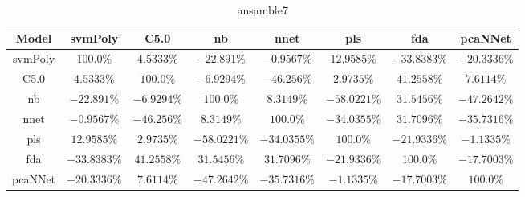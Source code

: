 \begin{table}[!ht]
	\centering
	\begin{tabular}{|c|c|c|c|c|c|c|c|}
		\hline
		Model & svmPoly & C5.0 & nb & nnet & pls & fda & pcaNNet \\ \hline
		svmPoly & $100.0\%$ & $4.5333\%$ & $-22.891\%$ & $-0.9567\%$ & $12.9585\%$ & $-33.8383\%$ & $-20.3336\%$ \\ \hline
		C5.0 & $4.5333\%$ & $100.0\%$ & $-6.9294\%$ & $-46.256\%$ & $2.9735\%$ & $41.2558\%$ & $7.6114\%$ \\ \hline
		nb & $-22.891\%$ & $-6.9294\%$ & $100.0\%$ & $8.3149\%$ & $-58.0221\%$ & $31.5456\%$ & $-47.2642\%$ \\ \hline
		nnet & $-0.9567\%$ & $-46.256\%$ & $8.3149\%$ & $100.0\%$ & $-34.0355\%$ & $31.7096\%$ & $-35.7316\%$ \\ \hline
		pls & $12.9585\%$ & $2.9735\%$ & $-58.0221\%$ & $-34.0355\%$ & $100.0\%$ & $-21.9336\%$ & $-1.1335\%$ \\ \hline
		fda & $-33.8383\%$ & $41.2558\%$ & $31.5456\%$ & $31.7096\%$ & $-21.9336\%$ & $100.0\%$ & $-17.7003\%$ \\ \hline
		pcaNNet & $-20.3336\%$ & $7.6114\%$ & $-47.2642\%$ & $-35.7316\%$ & $-1.1335\%$ & $-17.7003\%$ & $100.0\%$ \\ \hline
	\end{tabular}
	\caption{ansamble7}
	\label{tab:ansamble7}
\end{table}
